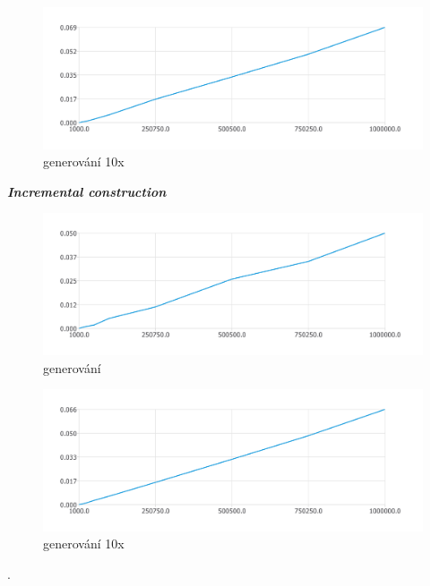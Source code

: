 \documentclass{article}
\begin{document}
\begin{figure}[htbp]
\centering
        \includegraphics[clip, trim=0cm 0cm 0cm 0cm, width=1\textwidth]{rang.pdf}
        \caption{generování 10x}
\end{figure}
\clearpage
\newpage
\textit{\textbf {Incremental construction}}
\\
\begin{figure}[htbp]
\centering
        \includegraphics[clip, trim=0cm 0cm 0cm 0cm, width=1\textwidth]{pdf7.pdf}
        \caption{generování}
\end{figure}
\begin{figure}[htbp]
\centering
        \includegraphics[clip, trim=0cm 0cm 0cm 0cm, width=1\textwidth]{rani.pdf}
        \caption{generování 10x}
\end{figure}
.\\
\clearpage
\newpage
\end{document}

